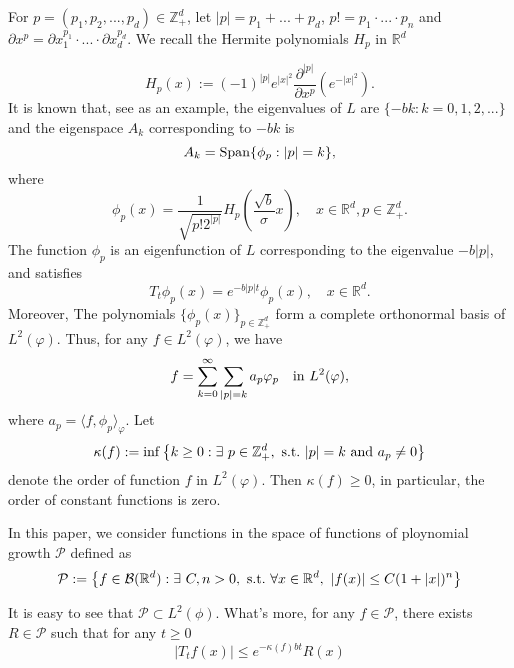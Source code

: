 \documentclass{article}
\begin{document}
For $p=(p_1,p_2,...,p_d) \in \mathbb{Z}_+^{d}$, let $|p|=p_1+...+p_d$, $p!=p_1 \cdot ... \cdot p_n$ and $\partial x^p =\partial x_1^{p_1} \cdot ... \cdot \partial x_d^{p_d}$. We recall the Hermite polynomials $H_p$ in $\mathbb{R}^d$

$$H_p(x):=(-1)^{|p|}e^{|x|^2} \frac{\partial ^{|p|}}{\partial x^p} \left ( e^{-|x|^2} \right ).$$
It is known that, see \cite{GD} as an example, the eigenvalues of $L$ are $\{-bk: k =0,1,2,...\}$ and the eigenspace $A_k$ corresponding to $-bk$ is
$$A_k = {\rm Span} \{\phi_p : |p|=k\},$$
where
\begin{equation}\label{eigenfunction}
    \phi_p(x)= \frac{1}{\sqrt{p!2^{|p|}}}H_p \left(\frac{\sqrt{b}}{\sigma}x \right ),\quad x\in \mathbb{R}^d, p\in \mathbb{Z}_+^d.
\end{equation}
 The function $\phi_p$ is an eigenfunction of $L$ corresponding to the eigenvalue $-b|p|$, and satisfies 
\begin{equation}\label{semigroupformula}
    T_t\phi_p(x)=e^{-b|p|t}\phi_p(x),\quad x\in \mathbb{R}^d.
\end{equation}
Moreover, The polynomials $\{\phi_p(x)\}_{p \in \mathbb{Z}_+^d}$ form a complete orthonormal basis of $L^2(\varphi)$. Thus, for any $f\in L^2(\varphi)$, we have
\begin{align}
    f=\sum_{k=0}^{\infty}\sum_{|p|=k}a_p \varphi_p \quad {\rm in~} L^2(\varphi), \label{semicomp1}
\end{align}
where $a_p=\langle f, \phi_p \rangle_{\varphi}$. Let
\begin{equation}\label{order}
    \kappa(f):=\inf \left \{k\geq 0: \exists ~ p\in \mathbb{Z}_+^d,{\rm ~s.t.~}|p|=k {\rm ~and~}  a_p \neq 0\right \}
\end{equation}
denote the order of function $f$ in $L^2(\varphi)$. Then $ \kappa(f)\geq 0$, in particular, the order of constant functions is zero.

In this paper, we consider functions in the space of functions of ploynomial growth $\mathcal{P}$ defined as
\begin{align*}
     \mathcal{P}:=\big \{f\in \mathcal{B}(\mathbb{R}^d):\exists~ C, n>0, {\rm ~s.t.~} \forall x\in \mathbb{R}^d,~ |f(x)|\leq C(1+|x|)^n\big\}
\end{align*}


It is easy to see that $\mathcal{P} \subset L^2(\phi)$. What's more, for any $f \in \mathcal{P}$, there exists $R \in \mathcal{P}$ such that for any $t\geq 0$
\begin{equation}\label{semigroupineq}
    |T_tf(x)| \leq e^{-\kappa(f)bt}R(x) 
\end{equation}
\end{document}
